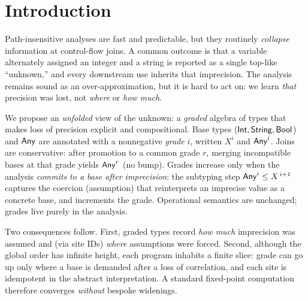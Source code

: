 \section{Introduction}

Path-insensitive analyses are fast and predictable, but they routinely \emph{collapse} information at control-flow joins.
A common outcome is that a variable alternately assigned an integer and a string is reported as a single top-like ``unknown,'' and every downstream use inherits that imprecision.
The analysis remains sound as an over-approximation, but it is hard to act on: we learn \emph{that} precision was lost, not \emph{where} or \emph{how much}.

We propose an \emph{unfolded} view of the unknown: a \emph{graded} algebra of types that makes loss of precision explicit and compositional.
Base types (\(\mathsf{Int},\mathsf{String},\mathsf{Bool}\)) and \(\mathsf{Any}\) are annotated with a nonnegative \emph{grade} \(i\), written \(X^{i}\) and \(\mathsf{Any}^{i}\).
Joins are conservative: after promotion to a common grade \(r\), merging incompatible bases at that grade yields \(\mathsf{Any}^{r}\) (no bump).
Grades increase only when the analysis \emph{commits to a base after imprecision}:
the subtyping step \(\mathsf{Any}^{i} \le X^{\,i+1}\) captures the coercion (assumption) that reinterprets an imprecise value as a concrete base, and increments the grade.
Operational semantics are unchanged; grades live purely in the analysis.

Two consequences follow.
First, graded types record \emph{how much} imprecision was assumed and (via site IDs) \emph{where} assumptions were forced.
Second, although the global order has infinite height, each program inhabits a finite slice:
grade can go up only where a base is demanded after a loss of correlation, and each site is idempotent in the abstract interpretation.
A standard fixed-point computation therefore converges \emph{without} bespoke widenings.

